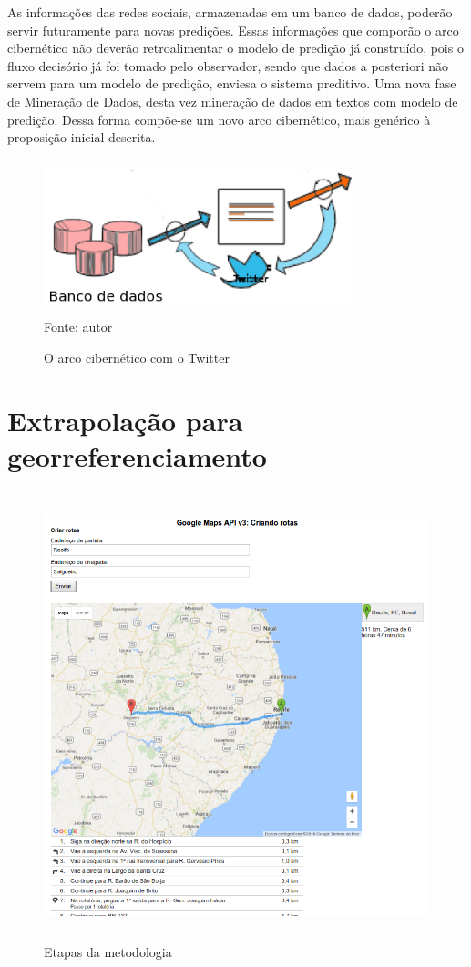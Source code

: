 As informações das redes sociais, armazenadas em um banco de dados, poderão servir futuramente para novas predições.
Essas informações que comporão o arco cibernético não deverão retroalimentar o modelo de predição já construído, pois o fluxo decisório
já foi tomado pelo observador, sendo que dados a posteriori não servem para um modelo de predição, enviesa o sistema preditivo.
Uma nova fase de Mineração de Dados, desta vez mineração de dados em textos com modelo de predição. 
Dessa forma compõe-se um novo arco cibernético, mais genérico à proposição inicial descrita.

\begin{figure}[ht]
	\centering
	\caption{O arco cibernético com o Twitter}
	\includegraphics[width=90mm, height=45mm]{Figuras/Metodologia/ArcoCibernetico.png}\\
	\tiny Fonte: autor
\end{figure}

\pagebreak

\section{Extrapolação para georreferenciamento}

\begin{figure}[ht]
	\centering
	\caption{Etapas da metodologia}
	\includegraphics[width=150mm, height=130mm]{Figuras/Cronograma/GoogleMaps.png}
\end{figure}



